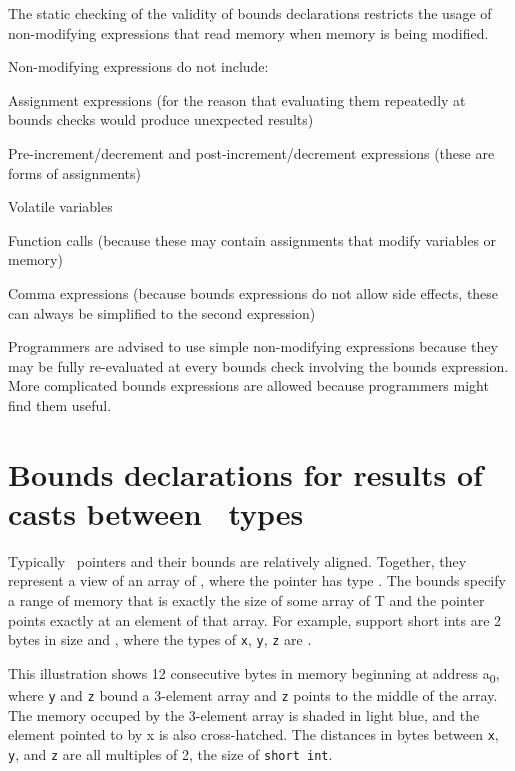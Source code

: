 The static checking of the validity of bounds declarations restricts the
usage of non-modifying expressions that read memory when memory is being
modified.

Non-modifying expressions do not include:

\begin{compactitem}
\item
  Assignment expressions (for the reason that evaluating them repeatedly
  at bounds checks would produce unexpected results)
\item
  Pre-increment/decrement and post-increment/decrement expressions
  (these are forms of assignments)
\item
  Volatile variables
\item
  Function calls (because these may contain assignments that modify
  variables or memory)
\item
  Comma expressions (because bounds expressions do not allow side
  effects, these can always be simplified to the second expression)
\end{compactitem}

Programmers are advised to use simple non-modifying expressions because
they may be fully re-evaluated at every bounds check involving the
bounds expression. More complicated bounds expressions are allowed
because programmers might find them useful.

\section{Bounds declarations for results of casts between \arrayptr\ types}
\label{section:pointer-cast-results}

Typically \arrayptr\ pointers and their bounds are relatively
aligned. Together, they represent a view of an array of , where
the pointer has type
\arrayptrT. The
bounds specify a range of memory that is exactly the size of some array
of T and the pointer points exactly at an element of that array. For
example, support short ints are 2 bytes in size and 
{\texttt{}}, where the types of \texttt{x},
\texttt{y}, \texttt{z} are  .

This illustration shows 12 consecutive bytes in memory beginning at
address a\textsubscript{0}, where \texttt{y} and \texttt{z} bound a
3-element array and \texttt{z} points to the middle of the array. The
memory occuped by the 3-element array is shaded in light blue, and the
element pointed to by x is also cross-hatched. The distances in bytes
between \texttt{x}, \texttt{y}, and \texttt{z} are all multiples of 2,
the size of \texttt{short int}.
\begin{center}
\end{center}

